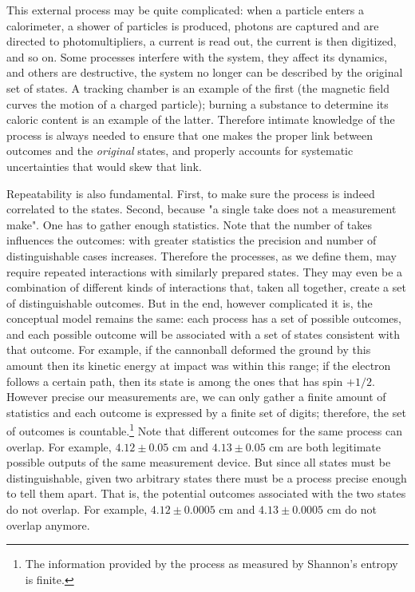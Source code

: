 \documentclass[aps,pra,10pt,twocolumn,floatfix,nofootinbib]{revtex4-1}
\theoremstyle{definition}
\begin{document}
This external process may be quite complicated: when a particle enters a calorimeter, a shower of particles is produced, photons are captured and are directed to photomultipliers, a current is read out, the current is then digitized, and so on. Some processes interfere with the system, they affect its dynamics, and others are destructive, the system no longer can be described by the original set of states. A tracking chamber is an example of the first (the magnetic field curves the motion of a charged particle); burning a substance to determine its caloric content is an example of the latter. Therefore intimate knowledge of the process is always needed to ensure that one makes the proper link between outcomes and the \emph{original} states, and properly accounts for systematic uncertainties that would skew that link.

Repeatability is also fundamental. First, to make sure the process is indeed correlated to the states. Second, because "a single take does not a measurement make". One has to gather enough statistics. Note that the number of takes influences the outcomes: with greater statistics the precision and number of distinguishable cases increases. Therefore the processes, as we define them, may require repeated interactions with similarly prepared states. They may even be a combination of different kinds of interactions that, taken all together, create a set of distinguishable outcomes. But in the end, however complicated it is, the conceptual model remains the same: each process has a set of possible outcomes, and each possible outcome will be associated with a set of states consistent with that outcome. For example, if the cannonball deformed the ground by this amount then its kinetic energy at impact was within this range; if the electron follows a certain path, then its state is among the ones that has spin $+1/2$.
However precise our measurements are, we can only gather a finite amount of statistics and each outcome is expressed by a finite set of digits; therefore, the set of outcomes is countable.\footnote{The information provided by the process as measured by Shannon's entropy is finite.} Note that different outcomes for the same process can overlap. For example, $4.12 \pm 0.05$ cm and $4.13 \pm 0.05$ cm are both legitimate possible outputs of the same measurement device. But since all states must be distinguishable, given two arbitrary states there must be a process precise enough to tell them apart. That is, the potential outcomes associated with the two states do not overlap. For example, $4.12 \pm 0.0005$ cm and $4.13 \pm 0.0005$ cm do not overlap anymore.
\end{document}
